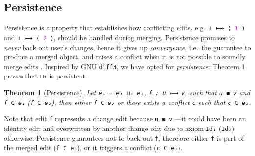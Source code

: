 \documentclass{sigplanconf}
\theoremstyle{plain}
\newtheorem{thm}{Theorem}
\begin{document}
\subsection{Persistence}
Persistence is a property that establishes how conflicting edits,
e.g.\ \texttt{⊥ ⟼ ⟨ \textcolor{magenta}{1} ⟩} and \texttt{⊥ ⟼ ⟨
  \textcolor{magenta}{2} ⟩}, should be handled during merging.
%
Persistence promises to \emph{never} back out user's changes, hence it
gives up \emph{convergence}, i.e.\ the guarantee to produce a merged
object, and raises a conflict when it is not possible to soundly merge
edits \cite{Pierce07}.
%
Inspired by GNU \texttt{diff3}, we have opted for \emph{persistence}:
Theorem \ref{thm:persistence} proves that \texttt{⊔₃} is persistent.



				
\begin{thm}[Persistence]
\label{thm:persistence}
Let \texttt{e₃ = e₁ ⊔₃ e₂}, \texttt{f : u ⟼ v}, such that \texttt{u ≢
  v} and \texttt{f ∈ e₁} (\texttt{f ∈ e₂}), then either \texttt{f ∈
  e₃} or there exists a conflict \texttt{c} such that \texttt{c ∈ e₃}.
\end{thm}
Note that edit \texttt{f} represents a change edit because \texttt{u ≢
  v} ---it could have been an identity edit and overwritten by another
change edit due to axiom \texttt{Id₁} (\texttt{Id₂}) otherwise.
%
Persistence guarantees not to back out \texttt{f}, therefore either
\texttt{f} is part of the merged edit (\texttt{f ∈ e₃}), or it
triggers a conflict (\texttt{c ∈ e₃}).
%
\end{document}
